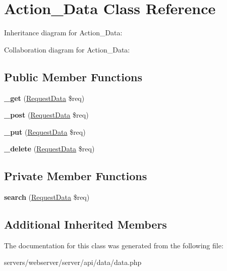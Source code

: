\hypertarget{class_lora_1_1_api_1_1_action___data}{}\section{Action\+\_\+\+Data Class Reference}
\label{class_lora_1_1_api_1_1_action___data}


Inheritance diagram for Action\+\_\+\+Data\+:


Collaboration diagram for Action\+\_\+\+Data\+:
\subsection*{Public Member Functions}
\begin{DoxyCompactItemize}
\item 
\mbox{\label{class_lora_1_1_api_1_1_action___data_a3ad4bf1b146a3180b34d1327ff2abf69}} 
{\bfseries \+\_\+get} (\hyperlink{class_request_data}{Request\+Data} \$req)
\item 
\mbox{\label{class_lora_1_1_api_1_1_action___data_a50751d47a139282d1c3b08cab1b6562e}} 
{\bfseries \+\_\+post} (\hyperlink{class_request_data}{Request\+Data} \$req)
\item 
\mbox{\label{class_lora_1_1_api_1_1_action___data_a2affcc8f31c13147c33450193b229194}} 
{\bfseries \+\_\+put} (\hyperlink{class_request_data}{Request\+Data} \$req)
\item 
\mbox{\label{class_lora_1_1_api_1_1_action___data_ab8ddc6de1e04524212f7d55893f78864}} 
{\bfseries \+\_\+delete} (\hyperlink{class_request_data}{Request\+Data} \$req)
\end{DoxyCompactItemize}
\subsection*{Private Member Functions}
\begin{DoxyCompactItemize}
\item 
\mbox{\label{class_lora_1_1_api_1_1_action___data_adea63eb9d6f49832427cbb855c4c59ce}} 
{\bfseries search} (\hyperlink{class_request_data}{Request\+Data} \$req)
\end{DoxyCompactItemize}
\subsection*{Additional Inherited Members}


The documentation for this class was generated from the following file\+:\begin{DoxyCompactItemize}
\item 
servers/webserver/server/api/data/data.\+php\end{DoxyCompactItemize}
